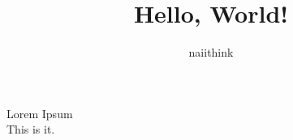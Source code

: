 \documentclass{article}
\title{Hello, World!}
\author{naiithink}
\begin{document}
    \maketitle
    Lorem Ipsum \\
    This is it.
\end{document}
